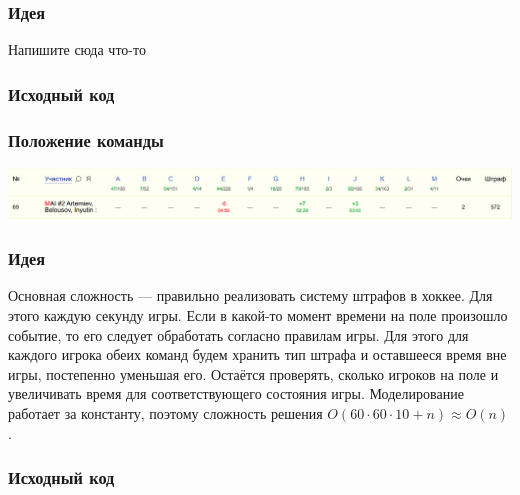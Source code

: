 \documentclass[12pt]{article}
\begin{document}

\subsubsection*{Идея}
Напишите сюда что-то

\subsubsection*{Исходный код}

\subsubsection*{Положение команды}
\includegraphics[scale=0.25]{images/gp_korea.png}\newline\noindent
\pagebreak


\subsubsection*{Идея}
Основная сложность --- правильно реализовать систему штрафов в хоккее. Для этого каждую секунду игры. Если в какой-то момент времени на поле произошло событие, то его следует обработать согласно правилам игры. Для этого для каждого игрока обеих команд будем хранить тип штрафа и оставшееся время вне игры, постепенно уменьшая его. Остаётся проверять, сколько игроков на поле и увеличивать время для соответствующего состояния игры. Моделирование работает за константу, поэтому сложность решения $O(60 \cdot 60 \cdot 10 + n) \approx O(n)$.

\subsubsection*{Исходный код}

\end{document}
